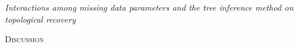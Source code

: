 \documentclass[12pt,letterpaper]{article}
\renewcommand{\section}[1]{%
\bigskip
\begin{center}
\begin{Large}
\normalfont\scshape #1
\medskip
\end{Large}
\end{center}}
\renewcommand{\subsection}[1]{%
\bigskip
\begin{center}
\begin{large}
\normalfont\itshape #1
\end{large}
\end{center}}
\begin{document}
\subsection{Interactions among missing data parameters and the tree inference method on topological recovery}


%
%


\section{Discussion}
\end{document}
